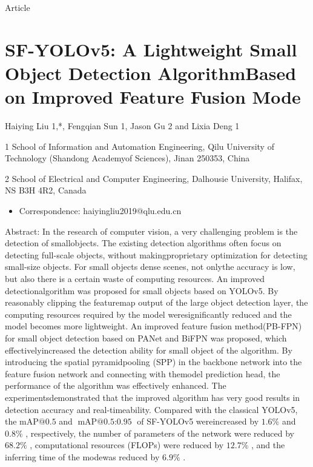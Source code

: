 \documentclass[
  10
]{article}
\author{}
\date{}
\providecommand{\tightlist}{%
  \setlength{\itemsep}{0pt}\setlength{\parskip}{0pt}}
\begin{document}
Article

\section{SF-YOLOv5: A Lightweight Small Object Detection AlgorithmBased
on Improved Feature Fusion
Mode}\label{sf-yolov5-a-lightweight-small-object-detection-algorithmbased-on-improved-feature-fusion-mode}

Haiying Liu 1,*, Fengqian Sun 1, Jason Gu 2 and Lixia Deng 1

1 School of Information and Automation Engineering, Qilu University of
Technology (Shandong Academyof Sciences), Jinan 250353, China

2 School of Electrical and Computer Engineering, Dalhousie University,
Halifax, NS B3H 4R2, Canada

\begin{itemize}
\tightlist
\item
  Correspondence: haiyingliu2019@qlu.edu.cn
\end{itemize}

Abstract: In the research of computer vision, a very challenging problem
is the detection of smallobjects. The existing detection algorithms
often focus on detecting full-scale objects, without makingproprietary
optimization for detecting small-size objects. For small objects dense
scenes, not onlythe accuracy is low, but also there is a certain waste
of computing resources. An improved detectionalgorithm was proposed for
small objects based on YOLOv5. By reasonably clipping the featuremap
output of the large object detection layer, the computing resources
required by the model weresignificantly reduced and the model becomes
more lightweight. An improved feature fusion method(PB-FPN) for small
object detection based on PANet and BiFPN was proposed, which
effectivelyincreased the detection ability for small object of the
algorithm. By introducing the spatial pyramidpooling (SPP) in the
backbone network into the feature fusion network and connecting with
themodel prediction head, the performance of the algorithm was
effectively enhanced. The experimentsdemonstrated that the improved
algorithm has very good results in detection accuracy and
real-timeability. Compared with the classical YOLOv5, the
\(\mathrm { m A P @ 0 . 5 }\) and
\(\operatorname* { m A P @ 0 . 5 : 0 . 9 5 }\) of SF-YOLOv5
wereincreased by \(1 . 6 \%\) and \(0 . 8 \%\) , respectively, the
number of parameters of the network were reduced by\(6 8 . 2 \%\) ,
computational resources (FLOPs) were reduced by \(1 2 . 7 \%\) , and the
inferring time of the modewas reduced by \(6 . 9 \%\) .
\end{document}
